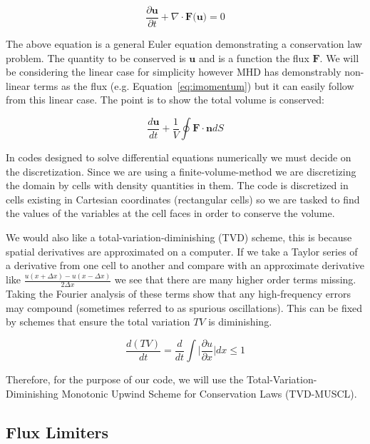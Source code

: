 \documentclass[12pt,upcase]{umlthesis}
\begin{document}
\begin{equation}\label{eq:geneuler}
	\frac{\partial \textbf{u}}{\partial t} + \nabla \cdot \textbf{F(u)} = 0
\end{equation}

The above equation is a general Euler equation demonstrating a conservation law problem. The quantity to be conserved is $\textbf{u}$ and is a function the flux $\textbf{F}$. We will be considering the linear case for simplicity however MHD has demonstrably non-linear terms as the flux (e.g. Equation~\ref{eq:imomentum}) but it can easily follow from this linear case. The point is to show the total volume is conserved:

\begin{equation}\label{eq:geneulerint}
	\frac{d\textbf{u}}{dt} + \frac{1}{V} \oint \textbf{F} \cdot \textbf{n} dS
\end{equation}

In codes designed to solve differential equations numerically we must decide on the discretization. Since we are using a finite-volume-method we are discretizing the domain by cells with density quantities in them. The code is discretized in cells existing in Cartesian coordinates (rectangular cells) so we are tasked to find the values of the variables at the cell faces in order to conserve the volume.

We would also like a total-variation-diminishing (TVD) scheme, this is because spatial derivatives are approximated on a computer. If we take a Taylor series of a derivative from one cell to another and compare with an approximate derivative like $\frac{u(x+\Delta x)-u(x-\Delta x)}{2\Delta x}$ we see that there are many higher order terms missing. Taking the Fourier analysis of these terms show that any high-frequency errors may compound (sometimes referred to as spurious oscillations). This can be fixed by schemes that ensure the total variation $TV$ is diminishing.

\begin{equation}\label{eq:tvd}
	\frac{d(TV)}{dt} = \frac{d}{dt} \int \lvert \frac{\partial u}{\partial x} \rvert dx \leq 1
\end{equation}

Therefore, for the purpose of our code, we will use the Total-Variation-Diminishing Monotonic Upwind Scheme for Conservation Laws (TVD-MUSCL).

\subsection{Flux Limiters}\label{sec:fluxlimiters}
\end{document}
